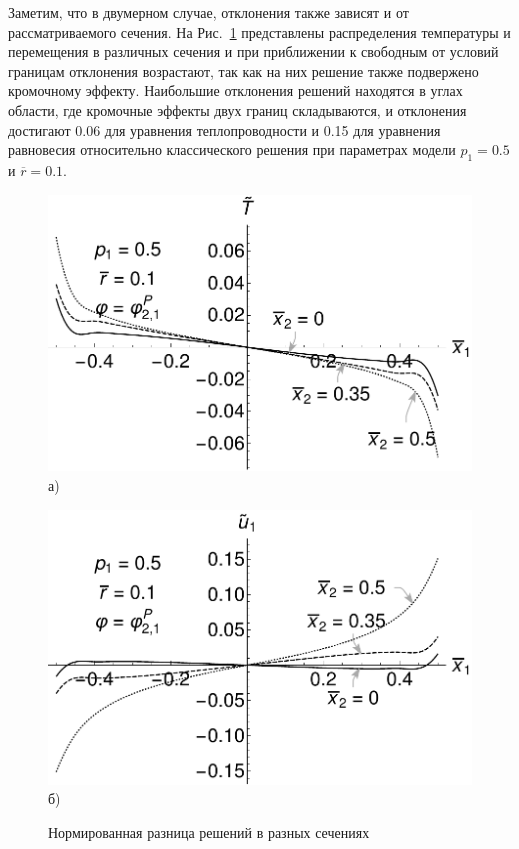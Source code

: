 Заметим, что в двумерном случае, отклонения также зависят и от рассматриваемого сечения. На Рис.~\ref{fig:VariationX2} представлены распределения температуры и перемещения в различных сечения и при приближении к свободным от условий границам отклонения возрастают, так как на них решение также подвержено кромочному эффекту. Наибольшие отклонения решений находятся в углах области, где кромочные эффекты двух границ складываются, и отклонения достигают 0.06 для уравнения теплопроводности и 0.15 для уравнения равновесия относительно классического решения при параметрах модели $p_1 = 0.5$ и $\overline{r} = 0.1$.

\begin{figure}[ht]
    \begin{minipage}[b][][b]{0.49\linewidth}\centering
        \includegraphics[width=\linewidth]{pics/TVarX2.pdf} \\ а)
    \end{minipage}
    \hfill
    \begin{minipage}[b][][b]{0.49\linewidth}\centering
        \includegraphics[width=\linewidth]{pics/U1VarX2.pdf} \\ б)
    \end{minipage}
    \caption{Нормированная разница решений в разных сечениях}
    \label{fig:VariationX2}
\end{figure}

